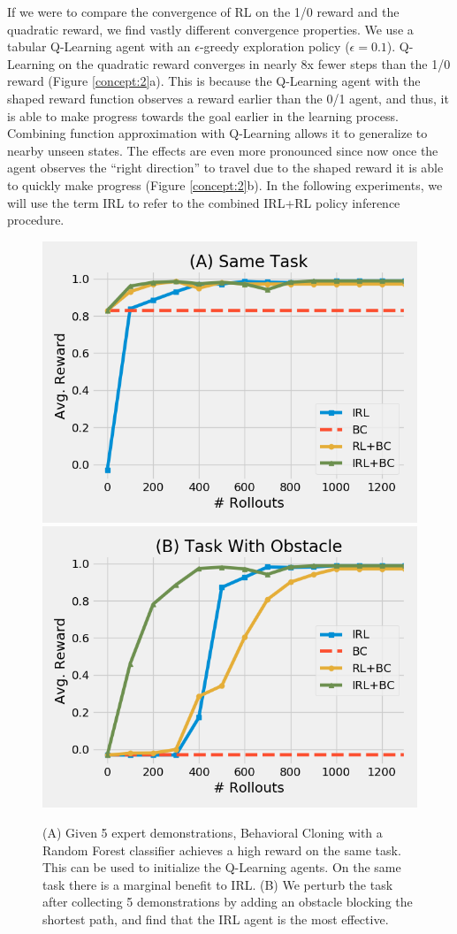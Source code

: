 If we were to compare the convergence of RL on the 1/0 reward and the quadratic reward, we find vastly different convergence properties.
We use a tabular Q-Learning agent with an $\epsilon$-greedy exploration policy ($\epsilon=0.1$).
Q-Learning on the quadratic reward converges in nearly 8x fewer steps than the 1/0 reward (Figure \ref{concept:2}a).
This is because the Q-Learning agent with the shaped reward function observes a reward earlier than the 0/1 agent, and thus, it is able to make progress towards the goal earlier in the learning process.
Combining function approximation with Q-Learning allows it to generalize to nearby unseen states.
The effects are even more pronounced since now once the agent observes the ``right direction'' to travel due to the shaped reward it is able to quickly make progress (Figure \ref{concept:2}b).
In the following experiments, we will use the term \textsf{IRL} to refer to the combined IRL+RL policy inference procedure.

\begin{figure}[t]
\centering
 \includegraphics[width=0.48\columnwidth]{concept/3.png}
  \includegraphics[width=0.48\columnwidth]{concept/4.png}
 \caption{(A) Given 5 expert demonstrations, Behavioral Cloning with a Random Forest classifier achieves a high reward on the same task. This can be used to initialize the Q-Learning agents. On the same task there is a marginal benefit to IRL. (B) We perturb the task after collecting 5 demonstrations by adding an obstacle blocking the shortest path, and find that the IRL agent is the most effective.  \label{concept:3}}
\end{figure}

